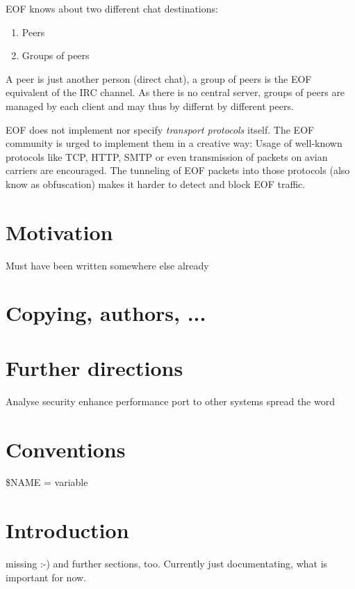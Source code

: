 \documentclass[12pt,a4paper]{book}
\begin{document}
EOF knows about two different chat destinations:
\begin{enumerate}
\item Peers
\item Groups of peers
\end{enumerate}
A peer is just another person (direct chat), a group of peers is the EOF
equivalent of the IRC channel\cite{irc-1}. As there is no central server,
groups of peers are managed by each client and may thus by differnt by
different peers.

EOF does not implement nor specify \emph{transport protocols} itself.
The EOF community is urged to implement them in a creative way: Usage
of well-known protocols like TCP\cite{tcp-1}, HTTP\cite{http-1},
SMTP\cite{smtp-1} or even transmission of packets on avian
carriers\cite{avian-1} are encouraged. The tunneling of EOF packets into
those protocols (also know as obfuscation) makes it harder to detect
and block EOF traffic.
\section{Motivation}
Must have been written somewhere else already
\section{Copying, authors, ...}
\section{Further directions}
Analyse security
enhance performance
port to other systems
spread the word
\section{Conventions}
\$NAME = variable
\section{Introduction}
missing :-)
and further sections, too. Currently just documentating, what is important
for now.
\end{document}
